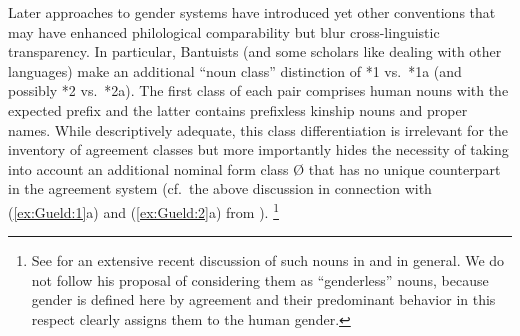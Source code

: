 \documentclass[output=collectionpaper]{langsci/langscibook}
\begin{document}
Later approaches to  gender systems have introduced yet other conventions that may have enhanced philological comparability but blur cross-linguistic transparency. In particular, Bantuists (and some scholars like \citealt[166]{Welmers1973} dealing with other  languages) make an additional ``noun class'' distinction of *1 vs.\ *1a (and possibly *2 vs.\ *2a). The first class of each pair comprises human nouns with the expected prefix and the latter contains prefixless kinship nouns and proper names. While descriptively adequate, this class differentiation is irrelevant for the inventory of agreement classes but more importantly hides the necessity of taking into account an additional nominal form class Ø that has no unique counterpart in the agreement system (cf.\ the above discussion in connection with (\ref{ex:Gueld:1}a) and (\ref{ex:Gueld:2}a) from ).%
\footnote{See \citet{VandeVelde2006} for an extensive recent discussion of such nouns in  and  in general. We do not follow his proposal of considering them as ``genderless'' nouns, because gender is defined here by agreement and their predominant behavior in this respect clearly assigns them to the human gender.}
\end{document}
